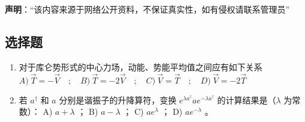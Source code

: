
\textbf{声明}：“该内容来源于网络公开资料，不保证真实性，如有侵权请联系管理员”

\subsection{选择题}
\begin{enumerate}
\item 对于库仑势形式的中心力场，动能、势能平均值之间应有如下关系
$A) \ \vec{T} = -\vec{V} \quad ; \quad B) \ \vec{T} = -2\vec{V} \quad ; \quad 
C) \ \vec{V} = \vec{T} \quad ; \quad D) \ \vec{V} = -2\vec{T} $
\item 若 $a^{\dagger}$ 和 $a$ 分别是谐振子的升降算符，变换 $e^{\lambda a^{\dagger}} a e^{-\lambda a^{\dagger}}$ 的计算结果是（$\lambda$ 为常数）：
A) $a + \lambda$ ； B) $a - \lambda$ ； C) $a e^{\lambda}$ ； D) $a e^{-\lambda}$ 。
\end{enumerate}

